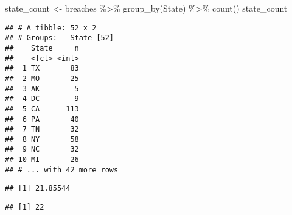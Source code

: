 \documentclass[
]{article}
\newenvironment{Shaded}{\begin{snugshade}}{\end{snugshade}}
\newcommand{\AttributeTok}[1]{\textcolor[rgb]{0.77,0.63,0.00}{#1}}
\newcommand{\ConstantTok}[1]{\textcolor[rgb]{0.00,0.00,0.00}{#1}}
\newcommand{\FunctionTok}[1]{\textcolor[rgb]{0.00,0.00,0.00}{#1}}
\newcommand{\NormalTok}[1]{#1}
\newcommand{\OtherTok}[1]{\textcolor[rgb]{0.56,0.35,0.01}{#1}}
\newcommand{\SpecialCharTok}[1]{\textcolor[rgb]{0.00,0.00,0.00}{#1}}
\begin{document}
\begin{Shaded}
\begin{Highlighting}[]
\NormalTok{state\_count }\OtherTok{\textless{}{-}}\NormalTok{ breaches }\SpecialCharTok{\%\textgreater{}\%}
  \FunctionTok{group\_by}\NormalTok{(State) }\SpecialCharTok{\%\textgreater{}\%}
  \FunctionTok{count}\NormalTok{()}
\NormalTok{state\_count}
\end{Highlighting}
\end{Shaded}

\begin{verbatim}
## # A tibble: 52 x 2
## # Groups:   State [52]
##    State     n
##    <fct> <int>
##  1 TX       83
##  2 MO       25
##  3 AK        5
##  4 DC        9
##  5 CA      113
##  6 PA       40
##  7 TN       32
##  8 NY       58
##  9 NC       32
## 10 MI       26
## # ... with 42 more rows
\end{verbatim}

\begin{Shaded}
\end{Shaded}

\begin{verbatim}
## [1] 21.85544
\end{verbatim}

\begin{Shaded}
\end{Shaded}

\begin{verbatim}
## [1] 22
\end{verbatim}
\end{document}

